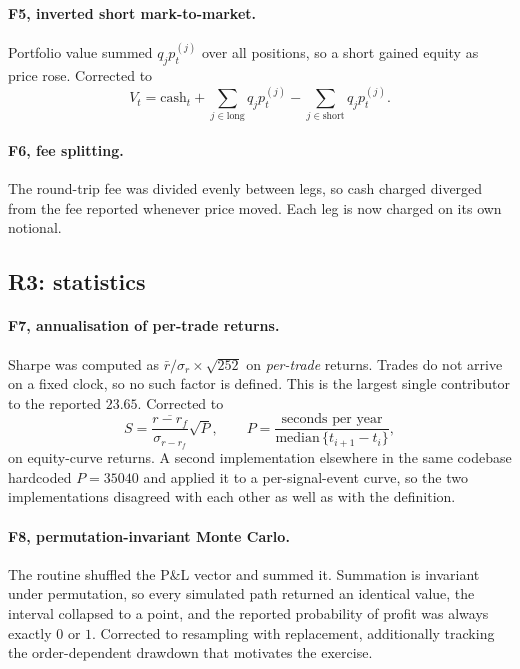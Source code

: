 \documentclass[preprint,12pt,authoryear]{elsarticle}
\begin{document}
\paragraph{F5, inverted short mark-to-market.} Portfolio value summed
$q_j p_t^{(j)}$ over all positions, so a short gained equity as price rose.
Corrected to
\begin{equation}
V_t = \text{cash}_t + \sum_{j \in \text{long}} q_j p_t^{(j)} - \sum_{j \in \text{short}} q_j p_t^{(j)}.
\label{eq:equity}
\end{equation}

\paragraph{F6, fee splitting.} The round-trip fee was divided evenly between
legs, so cash charged diverged from the fee reported whenever price moved. Each
leg is now charged on its own notional.

\subsection{R3: statistics}

\paragraph{F7, annualisation of per-trade returns.} Sharpe was computed as
$\bar{r}/\sigma_r \times \sqrt{252}$ on \emph{per-trade} returns. Trades do not
arrive on a fixed clock, so no such factor is defined. This is the largest single
contributor to the reported $23.65$. Corrected to
\begin{equation}
S = \frac{\overline{r - r_f}}{\sigma_{r - r_f}}\sqrt{P},
\qquad
P = \frac{\text{seconds per year}}{\mathrm{median}\,\{t_{i+1} - t_i\}},
\label{eq:sharpe}
\end{equation}
on equity-curve returns. A second implementation elsewhere in the same codebase
hardcoded $P = 35040$ and applied it to a per-signal-event curve, so the two
implementations disagreed with each other as well as with the definition.

\paragraph{F8, permutation-invariant Monte Carlo.} The routine shuffled the P\&L
vector and summed it. Summation is invariant under permutation, so every
simulated path returned an identical value, the interval collapsed to a point,
and the reported probability of profit was always exactly $0$ or $1$. Corrected
to resampling with replacement, additionally tracking the order-dependent
drawdown that motivates the exercise.
\end{document}
